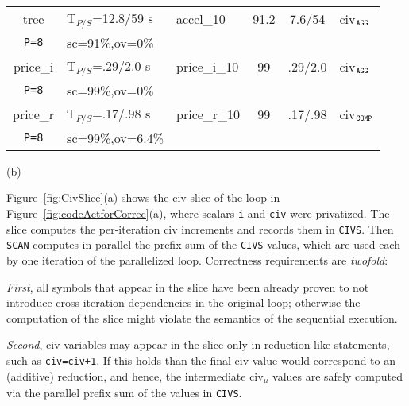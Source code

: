 \documentclass[10pt,nocopyrightspace]{sigplanconf}
\begin{document}
\begin{figure*}
\begin{minipage}{1.02\columnwidth}
\begin{tabular}{|c|l|l|c|c|l|}
{\sc tree}   &  T$_{P/S}$=12.8/59 s        & {\sc accel\_10}    & 91.2 & 7.6/54 & {\sc civ}$_{\tt{}AGG}$  \\            %
{\tt P=8}        &  {\sc sc}=91\%,{\sc ov}=0\% &                    &      &          &                           \\ \hline 
{\sc price\_i} &  T$_{P/S}$=.29/2.0 s        & {\sc price\_i\_10} & 99   & .29/2.0  & {\sc civ}$_{\tt{}AGG}$ \\ 
{\tt P=8}          &  {\sc sc}=99\%,{\sc ov}=0\% &                    &      &          &                           \\ \hline 
{\sc price\_r} &  T$_{P/S}$=.17/.98 s          & {\sc price\_r\_10}& 99   & .17/.98  & {\sc civ}$_{\tt{}COMP}$ \\ 

{\tt P=8}          &  {\sc sc}=99\%,{\sc ov}=6.4\% &                  &      &          &                          \\ \hline 
\end{tabular}
\begin{colorcode}

                        (b)
\end{colorcode}
\end{minipage}
\caption{ (a) Parallel Computation of {\sc civ}$_\mu$ Values.     (b) Characterization of Important CIV Loops.}
\label{fig:CivSlice} %
\end{figure*}

Figure~\ref{fig:CivSlice}(a) shows the {\sc civ} slice of the loop
in Figure~\ref{fig:codeActforCorrec}(a), where scalars {\tt i} and {\tt civ}
were privatized. The slice computes the per-iteration {\sc civ} increments 
and records them in {\tt CIVS}. Then {\tt SCAN}
computes in parallel the prefix sum of the {\tt CIVS} values, 
which are used each by one iteration of the parallelized loop.
%
Correctness requirements are {\em twofold}:  

{\em First}, all symbols that appear in the slice have been already proven 
to not introduce cross-iteration dependencies in the original loop; otherwise 
the computation of the slice might violate the semantics of the sequential execution. 

{\em Second}, {\sc civ} variables may appear in the slice only in reduction-like statements, 
such as {\tt civ=civ+1}.
If this holds than the final {\sc civ} value would correspond to an (additive) reduction, 
and hence, the intermediate {\sc civ}$_\mu$ values are safely computed via the parallel 
prefix sum of the values in {\tt CIVS}. 
\end{document}
